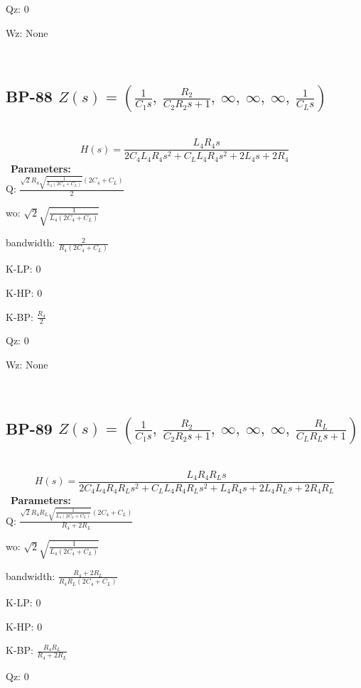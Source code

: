\documentclass{article}
\begin{document}
Qz: $0$\ 

Wz: $\text{None}$\ 

\ 

\subsection{BP-88 $Z(s) = \left( \frac{1}{C_{1} s}, \  \frac{R_{2}}{C_{2} R_{2} s + 1}, \  \infty, \  \infty, \  \infty, \  \frac{1}{C_{L} s}\right)$ } \ 
\textbf{\[H(s) = \frac{L_{4} R_{4} s}{2 C_{4} L_{4} R_{4} s^{2} + C_{L} L_{4} R_{4} s^{2} + 2 L_{4} s + 2 R_{4}}\] } \ 
\textbf{Parameters:}\\ 

Q: $\frac{\sqrt{2} R_{4} \sqrt{\frac{1}{L_{4} \left(2 C_{4} + C_{L}\right)}} \left(2 C_{4} + C_{L}\right)}{2}$\ 

wo: $\sqrt{2} \sqrt{\frac{1}{L_{4} \left(2 C_{4} + C_{L}\right)}}$\ 

bandwidth: $\frac{2}{R_{4} \left(2 C_{4} + C_{L}\right)}$\ 

K-LP: $0$\ 

K-HP: $0$\ 

K-BP: $\frac{R_{4}}{2}$\ 

Qz: $0$\ 

Wz: $\text{None}$\ 

\ 

\subsection{BP-89 $Z(s) = \left( \frac{1}{C_{1} s}, \  \frac{R_{2}}{C_{2} R_{2} s + 1}, \  \infty, \  \infty, \  \infty, \  \frac{R_{L}}{C_{L} R_{L} s + 1}\right)$ } \ 
\textbf{\[H(s) = \frac{L_{4} R_{4} R_{L} s}{2 C_{4} L_{4} R_{4} R_{L} s^{2} + C_{L} L_{4} R_{4} R_{L} s^{2} + L_{4} R_{4} s + 2 L_{4} R_{L} s + 2 R_{4} R_{L}}\] } \ 
\textbf{Parameters:}\\ 

Q: $\frac{\sqrt{2} R_{4} R_{L} \sqrt{\frac{1}{L_{4} \left(2 C_{4} + C_{L}\right)}} \left(2 C_{4} + C_{L}\right)}{R_{4} + 2 R_{L}}$\ 

wo: $\sqrt{2} \sqrt{\frac{1}{L_{4} \left(2 C_{4} + C_{L}\right)}}$\ 

bandwidth: $\frac{R_{4} + 2 R_{L}}{R_{4} R_{L} \left(2 C_{4} + C_{L}\right)}$\ 

K-LP: $0$\ 

K-HP: $0$\ 

K-BP: $\frac{R_{4} R_{L}}{R_{4} + 2 R_{L}}$\ 

Qz: $0$\ 
\end{document}
